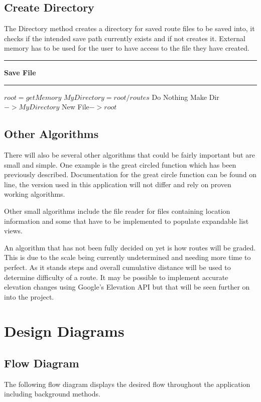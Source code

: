 \subsection{Create Directory}
The Directory method creates a directory for saved route files to be saved into, it checks if the intended save path currently exists and if not creates it. External memory has to be used for the user to have access to the file they have created. 

\vspace{0.3cm}
\hrule
\vspace{0.2cm}
\textbf{Save File}
\vspace{0.1cm}
\hrule
\vspace{0.1cm}
\begin{algorithmic}[1]
\State $root = get Memory$
\State $My Directory = root/routes$
	\State Do Nothing
	\Else
\State Make Dir $->My Directory$
\EndIf
\State New File$-> root$

\end{algorithmic}
\subsection{Other Algorithms}
There will also be several other algorithms that could be fairly important but are small and simple. One example is the great circled function which has been previously described. Documentation for the great circle function can be found on line, the version used in this application will not differ and rely on proven working algorithms. 

Other small algorithms include the file reader for files containing location information and some that have to be implemented to populate expandable list views.

An algorithm that has not been fully decided on yet is how routes will be graded. This is due to the scale being currently undetermined and needing more time to perfect. As it stands steps and overall cumulative distance will be used to determine difficulty of a route. It may be possible to implement accurate elevation changes using Google's Elevation API but that will be seen further on into the project. 
\section{Design Diagrams}
\subsection{Flow Diagram}
The following flow diagram displays the desired flow throughout the application including background methods.

